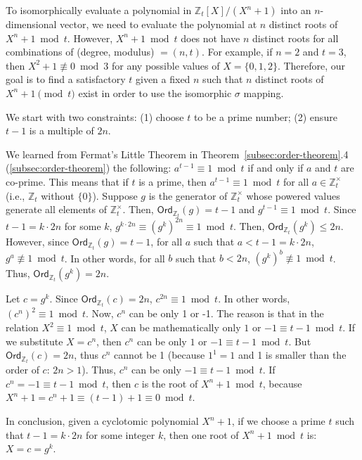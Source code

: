 To isomorphically evaluate a polynomial in $\mathbb{Z}_t[X]/(X^n + 1)$ into an $n$-dimensional vector, we need to evaluate the polynomial at $n$ distinct roots of $X^n + 1 \bmod t$. However, $X^n + 1 \bmod t$ does not have $n$ distinct roots for all combinations of (degree, modulus) $ = (n, t)$. For example, if $n = 2$ and $t = 3$, then $X^2+ 1 \not\equiv 0 \bmod 3$ for any possible values of $X = \{0, 1, 2\}$. Therefore, our goal is to find a satisfactory $t$ given a fixed $n$ such that $n$ distinct roots of $X^n + 1 \pmod t$ exist in order to use the isomorphic $\sigma$ mapping. 

We start with two constraints: (1) choose $t$ to be a prime number; (2) ensure $t-1$ is a multiple of $2n$.

We learned from Fermat's Little Theorem in Theorem~\ref*{subsec:order-theorem}.4 (\autoref{subsec:order-theorem}) the following: $a^{t - 1} \equiv 1 \bmod t$ if and only if $a$ and $t$ are co-prime. This means that if $t$ is a prime, then $a^{t - 1} \equiv 1 \bmod t$ for all $a \in \mathbb{Z}_t^{\times}$ (i.e., $\mathbb{Z}_t$ without $\{0\}$). Suppose $g$ is the generator of $\mathbb{Z}_t^{\times}$ whose powered values generate all elements of $\mathbb{Z}_t^{\times}$. Then, $\textsf{Ord}_{\mathbb{Z}_t}(g) = t - 1$ and $g^{t - 1} \equiv 1 \bmod t$. Since $t - 1 = k \cdot 2n$ for some $k$, $g^{k\cdot2n} \equiv (g^{k})^{2n} \equiv 1 \bmod t$. Then, $\textsf{Ord}_{\mathbb{Z}_t}(g^{k}) \leq 2n$. However, since $\textsf{Ord}_{\mathbb{Z}_t}(g) = t - 1$, for all $a$ such that $a < t - 1 = k \cdot 2n$, $g^a \not\equiv 1 \bmod t$. In other words, for all $b$ such that $b < 2n$, $(g^k)^b \not\equiv 1 \bmod t$. Thus, $\textsf{Ord}_{\mathbb{Z}_t}(g^{k}) = 2n$. 

Let $c = g^k$. Since $\textsf{Ord}_{\mathbb{Z}_t}(c) = 2n$, $c^{2n} \equiv 1 \bmod t$. In other words, $(c^n)^2 \equiv 1 \bmod t$. 
Now, $c^n$ can be only 1 or -1. The reason is that in the relation $X^2 \equiv 1 \bmod t$, $X$ can be mathematically only $1$ or $-1 \equiv t - 1 \bmod t$. If we substitute $X = c^n$, then $c^n$ can be only $1$ or $-1 \equiv t - 1 \bmod t$. But $\textsf{Ord}_{\mathbb{Z}_t}(c) = 2n$, thus $c^n$ cannot be 1 (because $1^1 = 1$ and 1 is smaller than the order of $c$: $2n > 1$). Thus, $c^n$ can be only $-1 \equiv t - 1 \bmod t$. If $c^n = -1 \equiv t - 1 \bmod t$, then $c$ is the root of $X^n + 1 \bmod t$, because $X^n + 1 = c^n + 1 \equiv (t - 1) + 1 \equiv 0 \bmod t$. 

In conclusion, given a cyclotomic polynomial $X^n + 1$, if we choose a prime $t$ such that $t - 1 = k \cdot 2n$ for some integer $k$, then one root of $X^n + 1 \bmod t$ is: $X = c = g^k$. 


